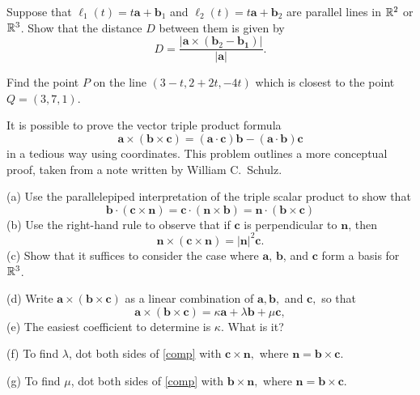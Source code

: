 \documentclass[prettycode,shellescape]{watsonbook}
\begin{document}
\begin{aexercise}
  Suppose that $\ell_1(t)=t\mathbf{a}+\mathbf{b}_1$ and
  $\ell_2(t)=t\mathbf{a}+\mathbf{b}_2$ are parallel lines in $\mathbb{R}^2$ or
  $\mathbb{R}^3$. Show that the distance $D$ between them is given by
  \[
    D =
    \frac{|\mathbf{a}\times(\mathbf{b}_2-\mathbf{b_1})|}{|\mathbf{a}|}.
  \]
\end{aexercise}

\begin{aexercise}
  Find the point $P$ on the line $(3-t,2+2t,-4t)$ which is closest to
  the point $Q=(3,7,1)$.
\end{aexercise}

\begin{aexercise}%
  It is possible to prove the vector triple product formula
  \[
    \mathbf{a}\times(\mathbf{b}\times\mathbf{c}) =
    (\mathbf{a}\cdot\mathbf{c})\mathbf{b} -
    (\mathbf{a}\cdot\mathbf{b})\mathbf{c}
  \]
  in a tedious way using coordinates. This problem outlines a more
  conceptual proof, taken from a note written by William C.\ Schulz.

  (a) Use the parallelepiped interpretation of the triple scalar
  product to show that
  \[
    \mathbf{b}\cdot(\mathbf{c}\times\mathbf{n}) =
    \mathbf{c}\cdot(\mathbf{n}\times\mathbf{b}) =
    \mathbf{n}\cdot(\mathbf{b}\times\mathbf{c})
  \]
  (b) Use the right-hand rule to observe that if $\mathbf{c}$ is
  perpendicular to $\mathbf{n}$, then
  \[
    \mathbf{n}\times(\mathbf{c}\times\mathbf{n}) =
    |\mathbf{n}|^2\mathbf{c}.
  \]
  (c) Show that it suffices to consider the case where $\mathbf{a}$,
  $\mathbf{b}$, and $\mathbf{c}$ form a basis for $\mathbb{R}^3$.

  (d) Write $\mathbf{a}\times(\mathbf{b}\times\mathbf{c})$ as a linear
  combination of $\mathbf{a}, \mathbf{b},$ and $\mathbf{c},$ so that
  \begin{equation} \label{comp}
    \mathbf{a}\times(\mathbf{b}\times\mathbf{c}) = \kappa
    \mathbf{a}+\lambda \mathbf{b}+\mu\mathbf{c},
  \end{equation} 
  (e) The easiest coefficient to determine is $\kappa$. What is it?

  (f) To find $\lambda$, dot both sides of \eqref{comp} with
  $\mathbf{c}\times \mathbf{n},$ where
  $\mathbf{n}=  \mathbf{b}\times\mathbf{c}$.

  (g) To find $\mu$, dot both sides of \eqref{comp} with
  $\mathbf{b}\times \mathbf{n},$ where
  $\mathbf{n}=  \mathbf{b}\times\mathbf{c}$.
\end{aexercise}
\end{document}

